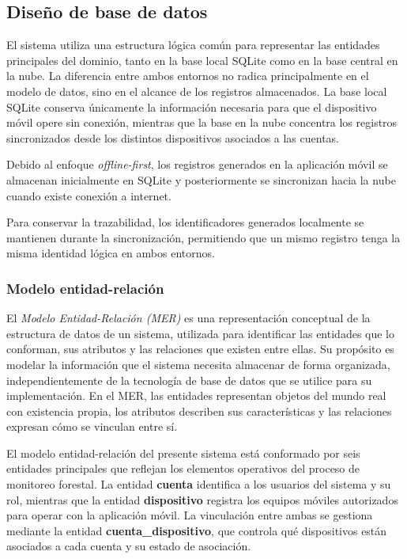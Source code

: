 \newpage
\subsection{Diseño de base de datos}

El sistema utiliza una estructura lógica común para representar las entidades principales del dominio, tanto en la base local SQLite como en la base central en la nube. La diferencia entre ambos entornos no radica principalmente en el modelo de datos, sino en el alcance de los registros almacenados. La base local SQLite conserva únicamente la información necesaria para que el dispositivo móvil opere sin conexión, mientras que la base en la nube concentra los registros sincronizados desde los distintos dispositivos asociados a las cuentas.

Debido al enfoque \textit{offline-first}, los registros generados en la aplicación móvil se almacenan inicialmente en SQLite y posteriormente se sincronizan hacia la nube cuando existe conexión a internet. 

Para conservar la trazabilidad, los identificadores generados localmente se mantienen durante la sincronización, permitiendo que un mismo registro tenga la misma identidad lógica en ambos entornos.

\subsubsection{Modelo entidad-relación}

El \textit{Modelo Entidad-Relación (MER)} es una representación conceptual de la estructura de datos de un sistema, utilizada para identificar las entidades que lo conforman, sus atributos y las relaciones que existen entre ellas. Su propósito es modelar la información que el sistema necesita almacenar de forma organizada, independientemente de la tecnología de base de datos que se utilice para su implementación. En el MER, las entidades representan objetos del mundo real con existencia propia, los atributos describen sus características y las relaciones expresan cómo se vinculan entre sí.

El modelo entidad-relación del presente sistema está conformado por seis entidades principales que reflejan los elementos operativos del proceso de monitoreo forestal. La entidad \textbf{cuenta} identifica a los usuarios del sistema y su rol, mientras que la entidad \textbf{dispositivo} registra los equipos móviles autorizados para operar con la aplicación móvil. La vinculación entre ambas se gestiona mediante la entidad \textbf{cuenta\_dispositivo}, que controla qué dispositivos están asociados a cada cuenta y su estado de asociación.

